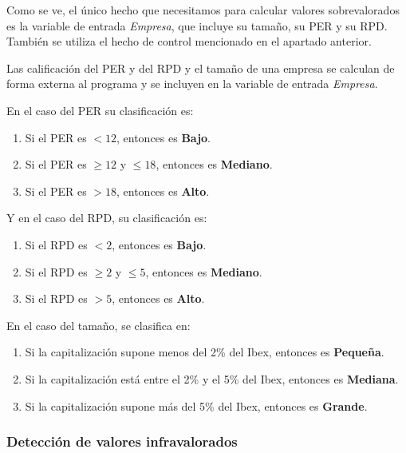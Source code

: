 \documentclass[11pt,openany]{book} %
\begin{document}
Como se ve, el único hecho que necesitamos para calcular valores sobrevalorados es la variable de entrada \textit{\textcolor{ocre}{Empresa}}, que incluye su tamaño, su PER y su RPD. También se utiliza el hecho de control mencionado en el apartado anterior.

Las calificación del PER y del RPD y el tamaño de una empresa se calculan de forma externa al programa y se incluyen en la variable de entrada \textcolor{ocre}{\textit{Empresa}}. 

En el caso del PER su clasificación es:

\begin{enumerate}[\qquad\color{ocre}{$\bullet$}]
    \item Si el PER es $< 12$, entonces es \textbf{\textcolor{ocre}{Bajo}}.
    \item Si el PER es $\geq 12$ y $\leq 18$, entonces es \textbf{\textcolor{ocre}{Mediano}}.
    \item Si el PER es $> 18$, entonces es \textbf{\textcolor{ocre}{Alto}}.
\end{enumerate}

Y en el caso del RPD, su clasificación es:

\begin{enumerate}[\qquad\color{ocre}{$\bullet$}]
    \item Si el RPD es $< 2$, entonces es \textbf{\textcolor{ocre}{Bajo}}.
    \item Si el RPD es $\geq 2$ y $\leq 5$, entonces es \textbf{\textcolor{ocre}{Mediano}}.
    \item Si el RPD es $> 5$, entonces es \textbf{\textcolor{ocre}{Alto}}.
\end{enumerate}

En el caso del tamaño, se clasifica en:

\begin{enumerate}[\qquad\color{ocre}{$\bullet$}]
    \item Si la capitalización supone menos del 2\% del Ibex, entonces es \textbf{\textcolor{ocre}{Pequeña}}.
    \item Si la capitalización está entre el 2\% y el 5\% del Ibex, entonces es \textbf{\textcolor{ocre}{Mediana}}.
    \item Si la capitalización supone más del 5\% del Ibex, entonces es \textbf{\textcolor{ocre}{Grande}}.
\end{enumerate}

\subsubsection{Detección de valores infravalorados}
\end{document}
